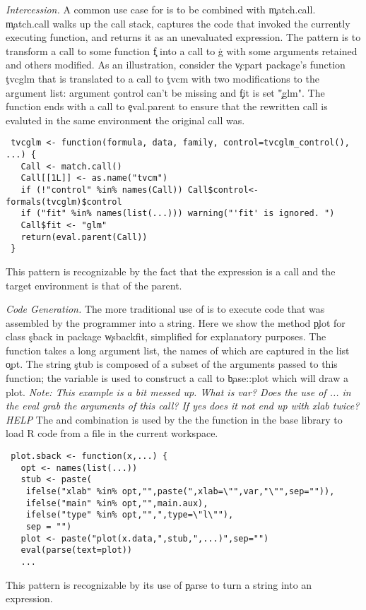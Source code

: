 \documentclass[acmsmall]{acmart}
\newcommand{\mypara}[1]{\medskip\noindent\emph{#1}\xspace}
\newcommand{\NOTE}[1]{{\it Note: #1}\xspace}
\begin{document}
\mypara{Intercession.} A common use case for \eval is to be combined
with \c{match.call}. \c{match.call} walks up the call stack, captures
the code that invoked the currently executing function, and returns it
as an unevaluated expression. The pattern is to transform a call to
some function \c{f} into a call to \c{g} with some arguments retained
and others modified. As an illustration, consider the \c{vcpart}
package's function \c{tvcglm} that is translated to a call to \c{tvcm}
with two modifications to the argument list: argument \c{control}
can't be missing and \c{fit} is set  \c{"glm"}. The
function ends with a call to \c{eval.parent} to ensure that the
rewritten call is evaluted in the same environment the original call
was.
\begin{lstlisting}
 tvcglm <- function(formula, data, family, control=tvcglm_control(), ...) {
   Call <- match.call()
   Call[[1L]] <- as.name("tvcm")
   if (!"control" %in% names(Call)) Call$control<-formals(tvcglm)$control
   if ("fit" %in% names(list(...))) warning("'fit' is ignored. ")
   Call$fit <- "glm"
   return(eval.parent(Call))
 }
\end{lstlisting}
This pattern is recognizable by the fact that the expression is a call
and the target environment is that of the parent.

\mypara{Code Generation.} The more traditional use of \eval is to
execute code that was assembled by the programmer into a string. Here
we show the method \c{plot} for class \c{sback} in package
\c{wsbackfit}, simplified for explanatory purposes. The function takes
a long argument list, the names of which are captured in the list
\c{opt}. The string \c{stub} is composed of a subset of the arguments
passed to this function; the variable is used to construct a call to
\c{base::plot} which will draw a plot. \NOTE{This example is a bit
  messed up. What is var? Does the use of ... in the eval grab the
  arguments of this call? If yes does it not end up with xlab twice?
  HELP} The \parse and \eval combination is used by the the \source
function in the base library to load R code from a file in the current
workspace.
\begin{lstlisting}
 plot.sback <- function(x,...) {
   opt <- names(list(...))
   stub <- paste(
    ifelse("xlab" %in% opt,"",paste(",xlab=\"",var,"\"",sep="")),
    ifelse("main" %in% opt,"",main.aux),
    ifelse("type" %in% opt,"",",type=\"l\""),
    sep = "")
   plot <- paste("plot(x.data,",stub,",...)",sep="")
   eval(parse(text=plot))
   ...
\end{lstlisting}
This pattern is recognizable by its use of \c{parse} to turn a string
into an expression.
\end{document}
